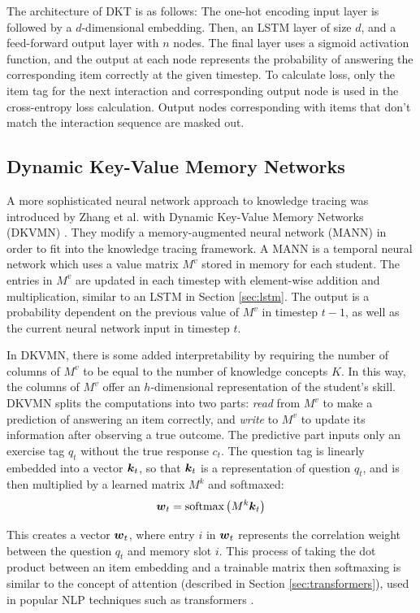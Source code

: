 The architecture of DKT is as follows: The one-hot encoding input layer is followed by a $d$-dimensional embedding. Then, an LSTM layer of size $d$, and a feed-forward output layer with $n$ nodes. The final layer uses a sigmoid activation function, and the output at each node represents the probability of answering the corresponding item correctly at the given timestep. To calculate loss, only the item tag for the next interaction and corresponding output node is used in the cross-entropy loss calculation. Output nodes corresponding with items that don't match the interaction sequence are masked out.

  \subsection{Dynamic Key-Value Memory Networks}\label{sec:dkvmn}
A more sophisticated neural network approach to knowledge tracing was introduced by Zhang et al. with Dynamic Key-Value Memory Networks (DKVMN) \cite{zhang2017}. They modify a memory-augmented neural network (MANN) in order to fit into the knowledge tracing framework. A MANN is a temporal neural network which uses a value matrix $M^v$ stored in memory for each student. The entries in $M^v$ are updated in each timestep with element-wise addition and multiplication, similar to an LSTM in Section \ref{sec:lstm}. The output is a probability dependent on the previous value of $M^v$ in timestep $t-1$, as well as the current neural network input in timestep $t$.

In DKVMN, there is some added interpretability by requiring the number of columns of $M^v$ to be equal to the number of knowledge concepts $K$. In this way, the columns of $M^v$ offer an $h$-dimensional representation of the student's skill. DKVMN splits the computations into two parts: \textit{read} from $M^v$ to make a prediction of answering an item correctly, and \textit{write} to $M^v$ to update its information after observing a true outcome. The predictive part inputs only an exercise tag $q_t$ without the true response $c_t$. The question tag is linearly embedded into a vector $\boldsymbol{k}_t$, so that $\boldsymbol{k}_t$ is a representation of question $q_t$, and is then multiplied by a learned matrix $M^k$ and softmaxed: 
\begin{equation}
  \boldsymbol{w}_t = \text{softmax}\left( M^k \boldsymbol{k}_t \right)
  \label{eq:dkvmn_weight}
\end{equation}

This creates a vector $\boldsymbol{w}_t$, where entry $i$ in $\boldsymbol{w}_t$ represents the correlation weight between the question $q_t$ and memory slot $i$. This process of taking the dot product between an item embedding and a trainable matrix then softmaxing is similar to the concept of attention (described in Section \ref{sec:transformers}), used in popular NLP techniques such as transformers \cite{vaswani2017}.

